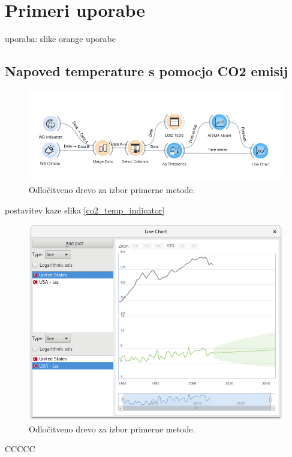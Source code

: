 \chapter{Primeri uporabe}

uporaba: slike orange uporabe

\section{Napoved temperature s pomocjo CO2 emisij}


\begin{figure}
\begin{center}
\includegraphics[width=12cm]{pic/co2_temp_setup.png}
\end{center}
\caption{Odločitveno drevo za izbor primerne metode.}
\label{co2_temp_setup}
\end{figure} 

postavitev kaze slika \ref{co2_temp_indicator}

\begin{figure}
\begin{center}
\includegraphics[width=12cm]{pic/co2_temp_forecast.png}
\end{center}
\caption{Odločitveno drevo za izbor primerne metode.}
\label{co2_temp_forecast}
\end{figure} 



CCCCC


